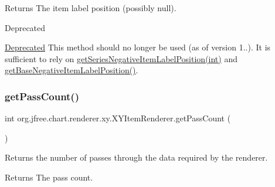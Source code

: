 \begin{DoxyReturn}{Returns}
The item label position (possibly {\ttfamily null}).
\end{DoxyReturn}
\begin{DoxyRefDesc}{Deprecated}
\item[\mbox{\hyperlink{deprecated__deprecated000236}{Deprecated}}]This method should no longer be used (as of version 1..). It is sufficient to rely on \mbox{\hyperlink{interfaceorg_1_1jfree_1_1chart_1_1renderer_1_1xy_1_1_x_y_item_renderer_a0f0aff12d691d7b3715e2d1f461d1441}{get\+Series\+Negative\+Item\+Label\+Position(int)}} and \mbox{\hyperlink{interfaceorg_1_1jfree_1_1chart_1_1renderer_1_1xy_1_1_x_y_item_renderer_aad96a9a12582675875421455a6177239}{get\+Base\+Negative\+Item\+Label\+Position()}}. \end{DoxyRefDesc}
\mbox{\label{interfaceorg_1_1jfree_1_1chart_1_1renderer_1_1xy_1_1_x_y_item_renderer_afe42489776da2a4c7e64838382bbaea1}} 
\subsubsection{\texorpdfstring{get\+Pass\+Count()}{getPassCount()}}
{\footnotesize\ttfamily int org.\+jfree.\+chart.\+renderer.\+xy.\+X\+Y\+Item\+Renderer.\+get\+Pass\+Count (\begin{DoxyParamCaption}{ }\end{DoxyParamCaption})}

Returns the number of passes through the data required by the renderer.

\begin{DoxyReturn}{Returns}
The pass count. 
\end{DoxyReturn}


